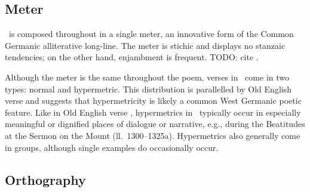 \subsection{Meter}

\Heliand\ is composed throughout in a single meter, an innovative form of the Common Germanic alliterative long-line.  The meter is stichic and displays no stanzaic tendencies; on the other hand, enjambment is frequent.  TODO: cite \textcite{Suzuki2004}.

Although the meter is the same throughout the poem, verses in \Heliand\ come in two types: normal and hypermetric.  This distribution is parallelled by Old English verse and suggests that hypermetricity is likely a common West Germanic poetic feature.  Like in Old English verse \parencite[clx]{KlaeberBeowulf}, hypermetrics in \Heliand\ typically occur in especially meaningful or dignified places of dialogue or narrative, e.g., during the Beatitudes at the Sermon on the Mount (ll.~1300--1325a).  Hypermetrics also generally come in groups, although single examples do occasionally occur.

\subsection{Orthography}

